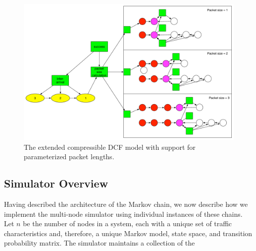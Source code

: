 \documentclass{llncs}
\begin{document}
\begin{figure}
\begin{center}
\includegraphics[scale=0.35]{../../sketches/compressible_dcf_all.pdf}
\caption{The extended compressible DCF model with support for parameterized packet lengths.}
\label{fig:compressible_dcf_all}
\end{center}
\end{figure}

\subsection{Simulator Overview}

Having described the architecture of the Markov chain, we now describe how we implement the multi-node simulator using individual instances of these chains. Let $n$ be the number of nodes in a system, each with a unique set of traffic characteristics and, therefore, a unique Markov model, state space, and transition probability matrix. The simulator maintains a collection of the 

\begin{algorithmic}


\ENDFOR

\end{algorithmic}
\end{document}
